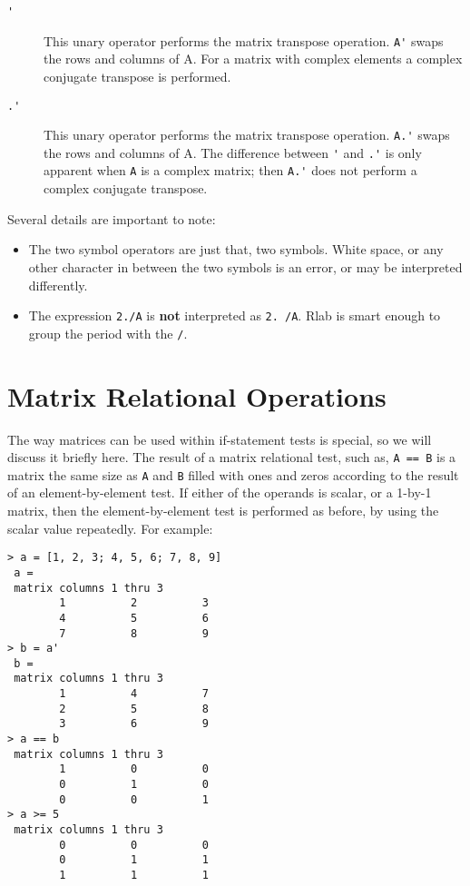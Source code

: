 \begin{description}
     \item[\verb+'+] This unary operator performs the matrix transpose
              operation. \verb+A'+ swaps the rows and columns of A.
              For a matrix with complex elements a complex conjugate
              transpose is performed.

     \item[\verb+.'+] This unary operator performs the matrix
              transpose operation. \verb+A.'+ swaps the rows and
              columns of A.  The difference between \verb+'+ and
              \verb+.'+ is only apparent when \verb+A+ is a complex
              matrix; then \verb+A.'+ does not perform a complex
              conjugate transpose.

   \end{description}

   Several details are important to note:

   \begin{itemize}

     \item The two symbol operators are just that, two symbols. White
           space, or any other character in between the two symbols is
           an error, or may be interpreted differently.

     \item The expression \verb+2./A+ is {\bf not} interpreted as
           \verb+2. /A+. Rlab is smart enough to group the period with
           the \verb+/+.

   \end{itemize}

\section{Matrix Relational Operations}

   The way matrices can be used within if-statement tests is special,
   so we will discuss it briefly here. The result of a matrix
   relational test, such as, \verb+A == B+ is a matrix the same size
   as \verb+A+ and \verb+B+ filled with ones and zeros according to
   the result of an element-by-element test. If either of the operands
   is scalar, or a 1-by-1 matrix, then the element-by-element test is
   performed as before, by using the scalar value repeatedly. For
   example:

\begin{verbatim}
> a = [1, 2, 3; 4, 5, 6; 7, 8, 9]
 a =
 matrix columns 1 thru 3
        1          2          3  
        4          5          6  
        7          8          9  
> b = a'
 b =
 matrix columns 1 thru 3
        1          4          7  
        2          5          8  
        3          6          9  
> a == b
 matrix columns 1 thru 3
        1          0          0  
        0          1          0  
        0          0          1  
> a >= 5
 matrix columns 1 thru 3
        0          0          0  
        0          1          1  
        1          1          1  
\end{verbatim}

